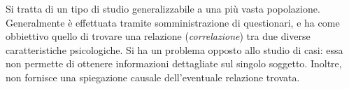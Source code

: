 \documentclass{subfiles}
\begin{document}
Si tratta di un tipo di studio generalizzabile a una più vasta popolazione.
Generalmente è effettuata tramite somministrazione di questionari, e ha come obbiettivo quello di trovare una relazione (\emph{correlazione})
tra due diverse caratteristiche psicologiche. Si ha un problema opposto allo studio di casi:
essa non permette di ottenere informazioni dettagliate sul singolo soggetto.
Inoltre, non fornisce una spiegazione causale dell'eventuale relazione trovata.
\end{document}
